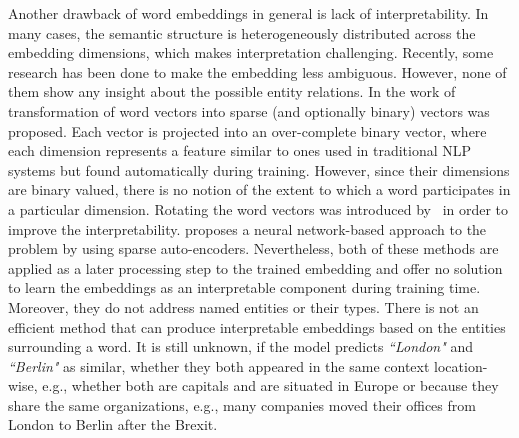 Another drawback of word embeddings in general is lack of interpretability. In many cases, the semantic structure is heterogeneously distributed across the embedding dimensions, which makes interpretation challenging. Recently, some research has been done to make the embedding less ambiguous. However, none of them show any insight about the possible entity relations. In the work of~ transformation of word vectors into sparse (and optionally binary) vectors was proposed. Each vector is projected into an over-complete binary vector, where each dimension represents a feature similar to ones used in traditional NLP systems but found automatically during training. However, since their dimensions are binary valued, there is no notion of the extent to which a word participates in a particular dimension. Rotating the word vectors was introduced by~ in order to improve the interpretability.   proposes a neural network-based approach to the problem by using sparse auto-encoders. Nevertheless, both of these methods are applied as a later processing step to the trained embedding and offer no solution to learn the embeddings as an interpretable component during training time. Moreover, they do not address named entities or their types. There is not an efficient method that can produce interpretable embeddings based on the entities surrounding a word. It is still unknown, if the model predicts \emph{``London"} and \emph{``Berlin"} as similar, whether they both appeared in the same context location-wise, e.g., whether both are capitals and are situated in Europe or because they share the same organizations, e.g., many companies moved their offices from London to Berlin after the Brexit. 

